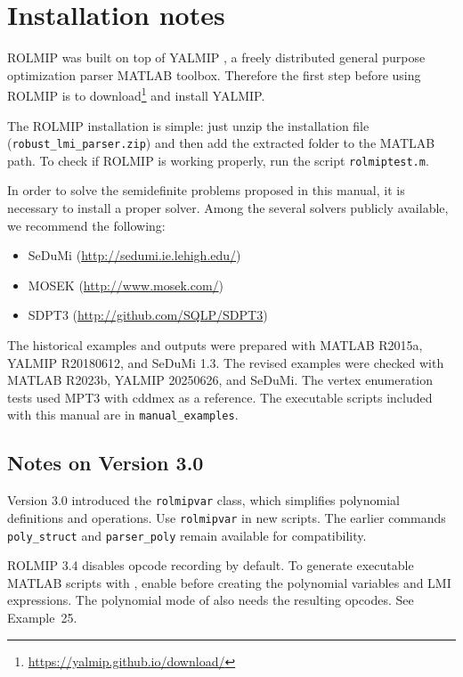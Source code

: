 \documentclass[english,11pt]{article}
\theoremstyle{break} \theorembodyfont{\small\rm}
\begin{document}
\section{Installation notes}

ROLMIP was built on top of YALMIP \cite{Lof:04}, a freely distributed general purpose optimization parser MATLAB toolbox.
Therefore the first step before using ROLMIP is to download\footnote{\url{https://yalmip.github.io/download/}} and install YALMIP.

The ROLMIP installation is simple: just unzip the installation file ({\tt robust\_lmi\_parser.zip}) and then add the extracted folder to the MATLAB path.
To check if ROLMIP is working properly, run the script {\tt rolmiptest.m}.

In order to solve the semidefinite problems proposed in this manual, it is necessary to install a proper solver. Among the several solvers publicly available,
we recommend the following:
\begin{itemize}
 \item SeDuMi (\url{http://sedumi.ie.lehigh.edu/})

 \item MOSEK (\url{http://www.mosek.com/})

 \item SDPT3 (\url{http://github.com/SQLP/SDPT3})
\end{itemize}

The historical examples and outputs were prepared with MATLAB R2015a,
YALMIP R20180612, and SeDuMi 1.3. The revised examples were checked with
MATLAB R2023b, YALMIP 20250626, and SeDuMi. The vertex enumeration tests
used MPT3 with cddmex as a reference. The executable scripts included
with this manual are in \texttt{manual\_examples}.


\subsection{Notes on Version 3.0}

Version 3.0 introduced the \texttt{rolmipvar} class, which simplifies
polynomial definitions and operations. Use \texttt{rolmipvar} in new
scripts. The earlier commands \texttt{poly\_struct} and
\texttt{parser\_poly} remain available for compatibility.

ROLMIP 3.4 disables opcode recording by default. To generate executable MATLAB scripts with , enable
 before creating the polynomial variables
and LMI expressions. The polynomial mode of  also needs
the resulting opcodes. See Example~25.
\end{document}
